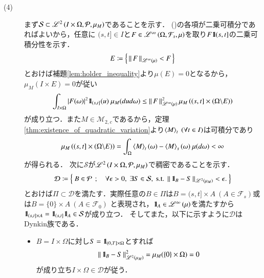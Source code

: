 \begin{prf}
\begin{description}
			\item[(4)]
				まず$\mathcal{S} \subset \mathscr{L}^{2} \left(I \times \Omega,\mathcal{P},\mu_M\right)$であることを示す．
				()の各項が二乗可積分であればよいから，任意に
				$(s,t] \in I$と$F \in \mathscr{L}^{\infty} \left(\Omega,\mathcal{F}_s,\mu\right)$を取り$F \mbox{1}\hspace{-0.25em}\mbox{l}{(s,t]}$の二乗可積分性を示す．
				\begin{align}
					E \coloneqq \left\{\, \left\|\, F\, \right\|_{\mathscr{L}^{\infty} \left(\mu\right)} < F\, \right\}
				\end{align}
				とおけば補題\ref{lem:holder_inequality}より$\mu(E) = 0$となるから，$\mu_M(I \times E) = 0$が従い
				\begin{align}
					\int_{I \times \Omega} |F(\omega)|^2 \mbox{1}\hspace{-0.25em}\mbox{l}_{(s,t]}(u)\ \mu_M(dud\omega) 
					\leq \left\|\, F\, \right\|_{\mathscr{L}^{\infty} \left(\mu\right)}^2 \mu_M\left((s,t] \times (\Omega \backslash E)\right) 
				\end{align}
				が成り立つ．また$M \in \mathcal{M}_{2,c}$であるから，定理\ref{thm:existence_of_quadratic_variation}より$\inprod<M>_t\ (\forall t \in I)$は可積分であり
				\begin{align}
					\mu_M\left((s,t] \times (\Omega \backslash E)\right) = \int_{\Omega} \inprod<M>_t(\omega) - \inprod<M>_s(\omega)\ \mu(d\omega) < \infty
				\end{align}
				が得られる．
				次に$\mathcal{S}$が$\mathscr{L}^{2} \left(I \times \Omega,\mathcal{P},\mu_M\right)$で稠密であることを示す．
				\begin{align}
					\mathcal{D} \coloneqq \left\{\ B \in \mathcal{P}\ \, ; \quad \mbox{$\forall \epsilon > 0,\ \exists S \in \mathcal{S},\ \mbox{s.t.}\ \left\|\, \mbox{1}\hspace{-0.25em}\mbox{l}_B - S\, \right\|_{\mathscr{L}^{2} \left(\mu_M\right)} < \epsilon.$}\ \right\}
				\end{align}
				とおけば$\Pi \subset \mathcal{D}$を満たす．実際任意の$B \in \Pi$は$B = (s,t] \times A\ (A \in \mathcal{F}_s)$或は$B = \{0\} \times A\ (A \in \mathcal{F}_0)$
				と表現され，$\mbox{1}\hspace{-0.25em}\mbox{l}_A \in \mathscr{L}^{\infty} \left(\mu\right)$を満たすから$\mbox{1}\hspace{-0.25em}\mbox{l}_{(s,t] \times A} = \mbox{1}\hspace{-0.25em}\mbox{l}_{(s,t]} \mbox{1}\hspace{-0.25em}\mbox{l}_A \in \mathcal{S}$が成り立つ．
				そしてまた，以下に示すように$\mathcal{D}$はDynkin族である．
				\begin{itemize}
					\item $B = I \times \Omega$に対し$S = \mbox{1}\hspace{-0.25em}\mbox{l}_{(0,T] \times \Omega}$とすれば
						\begin{align}
							\left\|\, \mbox{1}\hspace{-0.25em}\mbox{l}_B - S\, \right\|_{\mathscr{L}^{2} \left(\mu_M\right)}^2
							= \mu_M(\{0\} \times \Omega)
							= 0
						\end{align}
						が成り立ち$I \times \Omega \in \mathcal{D}$が従う．
					

\end{itemize}
\end{description}
\end{prf}
